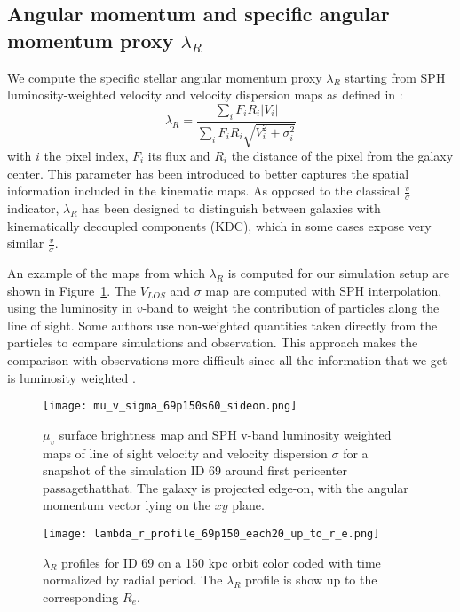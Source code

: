\subsection{Angular momentum and specific angular momentum proxy $\lambda_R$}
We compute the specific stellar angular momentum proxy $\lambda_R$ starting from SPH luminosity-weighted velocity and velocity dispersion maps as defined in \citet{Emsellem2007}: %
\begin{equation}
 \lambda_R = \dfrac{\sum_i F_i R_i |V_i|}{\sum_i F_i R_i \sqrt{V_i^2 + \sigma_i^2}}
\end{equation}
with $i$ the pixel index, $F_i$ its flux and $R_i$ the distance of the pixel from the galaxy center.
This parameter has been introduced to better captures the spatial information included in the kinematic maps.
As opposed to the classical $\frac{v}{\sigma}$ indicator, $\lambda_R$ has been designed to distinguish between galaxies with kinematically decoupled components (KDC), which in some cases expose very similar $\frac{v}{\sigma}$.

An example of the maps from which $\lambda_R$ is computed for our simulation setup are shown in Figure~\ref{fig:maps_lambda_r}.
The $V_{LOS}$ and $\sigma$ map are computed with SPH interpolation, using the luminosity in $v$-band to weight the contribution of particles along the line of sight.
Some authors \citep[e.g.][]{Schulze2018,Pillepich2019} use non-weighted quantities taken directly from the particles to compare simulations and observation.%
This approach makes the comparison with observations more difficult since all the information that we get is luminosity weighted \citep{Walo-Martin2020}.

\begin{figure}
\centering
\texttt{[image: mu\_v\_sigma\_69p150s60\_sideon.png]}
\caption{$\mu_v$ surface brightness map and SPH v-band luminosity weighted maps of line of sight velocity and velocity dispersion $\sigma$ for a snapshot of the simulation ID 69 around first pericenter passagethatthat.
The galaxy is projected edge-on, with the angular momentum vector lying on the $xy$ plane.}
\label{fig:maps_lambda_r}
\end{figure}

\begin{figure}
\centering
\texttt{[image: lambda\_r\_profile\_69p150\_each20\_up\_to\_r\_e.png]}
\caption{$\lambda_R$ profiles for ID 69 on a 150 kpc orbit color coded with time normalized by radial period. The $\lambda_R$ profile is show up to the corresponding $R_e$.}
\label{fig:lambda_r_profile}
\end{figure}

